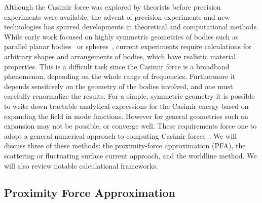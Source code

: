 Although the Casimir force was explored by theorists before precision experiments were available,
the advent of precision experiments and new technologies has spurred developments in 
theoretical and computational methods.
While early work focused on highly symmetric geometries 
of bodies such as parallel planar bodies~\cite{Casimir1948} or spheres~\cite{Boyer}, 
current experiments require calculations for arbitrary shapes and arrangements of bodies, 
which have realistic material properties.  
This is a difficult task since the Casimir force is a broadband phenomenon, depending on the whole 
range of frequencies.  Furthermore it depends sensitively on the geometry of the bodies involved, 
and one must carefully renormalize the results.  
For a simple, symmetric geometry it is possible to write down tractable analytical expressions for
the Casimir energy based on expanding the field in mode functions.  However for general geometries 
such an expansion may not be possible, or converge well.
These requirements force one to adopt a general numerical approach to computing Casimir forces~\cite{Johnson2011}.
We will discuss three of these methods: the proximity-force approximation (PFA), the scattering
or fluctuating surface current approach, and the worldline method.  We will also review notable
calculational frameworks.  


\subsection{Proximity Force Approximation}

